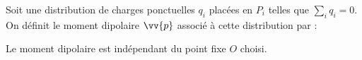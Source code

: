 ﻿\documentclass[a4paper]{article}
\begin{document}
\pagestyle{fancy}
\fancyhf{}
\setlength{\headheight}{15pt}

\begin{center}
	\large{}
\end{center}


Soit une distribution de charges ponctuelles \(q_i\) placées en \(P_i\) telles que \(\sum_iq_i=0\).\\
On définit le moment dipolaire \(\vv{p}\) associé à cette distribution par :
\begin{center}
\end{center}
Le moment dipolaire est indépendant du point fixe \(O\) choisi.
\end{document}
